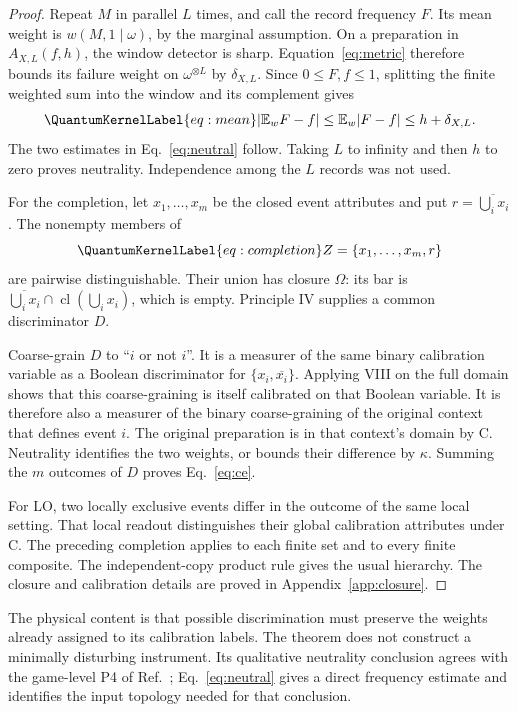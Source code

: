 \documentclass[a4paper,11pt,twocolumn,unpublished]{quantumarticle}
\let\label\QuantumKernelLabel
\DeclareMathOperator{\cl}{cl}
\newcommand{\EW}{\mathbb E_w}
\begin{document}
\begin{proof}
Repeat $M$ in parallel $L$ times, and call the record frequency $F$. Its mean weight is $w(M,1\mid\omega)$, by the marginal assumption. On a preparation in $A_{X,L}(f,h)$, the window detector is sharp. Equation~\eqref{eq:metric} therefore bounds its failure weight on $\omega^{\otimes L}$ by $\delta_{X,L}$. Since $0\leq F,f\leq1$, splitting the finite weighted sum into the window and its complement gives
\begin{equation}\label{eq:mean}
 |\EW F-f|\leq\EW|F-f|\leq h+\delta_{X,L}.
\end{equation}
The two estimates in Eq.~\eqref{eq:neutral} follow. Taking $L$ to infinity and then $h$ to zero proves neutrality. Independence among the $L$ records was not used.

For the completion, let $x_1,\ldots,x_m$ be the closed event attributes and put $r=\overline{\bigcup_i x_i}$. The nonempty members of
\begin{equation}\label{eq:completion}
 Z=\{x_1,\ldots,x_m,r\}
\end{equation}
are pairwise distinguishable. Their union has closure $\Omega$: its bar is $\overline{\bigcup_i x_i}\cap\cl(\bigcup_i x_i)$, which is empty. Principle IV supplies a common discriminator $D$.

Coarse-grain $D$ to ``$i$ or not $i$''. It is a measurer of the same binary calibration variable as a Boolean discriminator for $\{x_i,\overline{x_i}\}$. Applying VIII on the full domain shows that this coarse-graining is itself calibrated on that Boolean variable. It is therefore also a measurer of the binary coarse-graining of the original context that defines event $i$. The original preparation is in that context's domain by C. Neutrality identifies the two weights, or bounds their difference by $\kappa$. Summing the $m$ outcomes of $D$ proves Eq.~\eqref{eq:ce}.

For LO, two locally exclusive events differ in the outcome of the same local setting. That local readout distinguishes their global calibration attributes under C. The preceding completion applies to each finite set and to every finite composite. The independent-copy product rule gives the usual hierarchy. The closure and calibration details are proved in Appendix~\ref{app:closure}.
\end{proof}

The physical content is that possible discrimination must preserve the weights already assigned to its calibration labels. The theorem does not construct a minimally disturbing instrument. Its qualitative neutrality conclusion agrees with the game-level P4 of Ref.~\cite{ctp}; Eq.~\eqref{eq:neutral} gives a direct frequency estimate and identifies the input topology needed for that conclusion.
\end{document}
